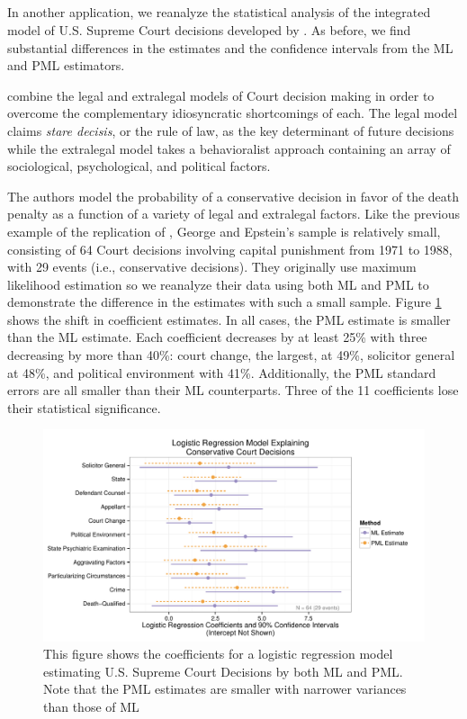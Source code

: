 \documentclass[12pt]{article}
\begin{document}
\subsection*{\cite{GeorgeEpstein1992}}

In another application, we reanalyze the statistical analysis of the integrated model of U.S. Supreme Court decisions developed by \cite{GeorgeEpstein1992}.
As before, we find substantial differences in the estimates and the confidence intervals from the ML and PML estimators.

\cite{GeorgeEpstein1992} combine the legal and extralegal models of Court decision making in order to overcome the complementary idiosyncratic shortcomings of each.
The legal model claims \emph{stare decisis}, or the rule of law, as the key determinant of future decisions while the extralegal model takes a behavioralist approach containing an array of sociological, psychological, and political factors.

The authors model the probability of a conservative decision in favor of the death penalty as a function of a variety of legal and extralegal factors.
Like the previous example of the replication of \cite{Weisiger2014}, George and Epstein's sample is relatively small, consisting of 64 Court decisions involving capital punishment from 1971 to 1988, with 29 events (i.e., conservative decisions).
They originally use maximum likelihood estimation so we reanalyze their data using both ML and PML to demonstrate the difference in the estimates with such a small sample.
Figure \ref{fig:ge-coefs} shows the shift in coefficient estimates.
In all cases, the PML estimate is smaller than the ML estimate.
Each coefficient decreases by at least 25\% with three decreasing by more than 40\%: court change, the largest, at 49\%, solicitor general at 48\%, and political environment with 41\%.
Additionally, the PML standard errors are all smaller than their ML counterparts.
Three of the 11 coefficients lose their statistical significance.

\begin{figure}[h]
\begin{center}
\includegraphics[width = \textwidth]{figs/ge-coefs.pdf}
\caption{This figure shows the coefficients for a logistic regression model estimating U.S. Supreme Court Decisions by both ML and PML. Note that the PML estimates are smaller with narrower variances than those of ML}\label{fig:ge-coefs}
\end{center}
\end{figure}
\end{document}
